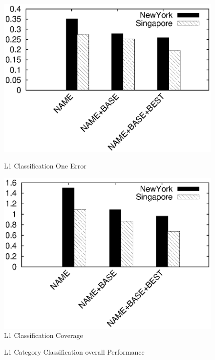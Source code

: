 \begin{figure}
\begin{minipage}[ht]{0.5\linewidth}
\centering
\includegraphics[width=\columnwidth]{plot/Graph_Youer/FirstClassOneError.eps}
\caption{L1 Classification One Error}
\label{fig:L1OneError}
\end{minipage}
\begin{minipage}[ht]{0.5\linewidth}
\centering
\includegraphics[width=\columnwidth]{plot/Graph_Youer/FirstClassCoverage.eps}
\caption{L1 Classification Coverage}
\label{fig:L1Coverage}
\end{minipage}
\end{figure}

\begin{figure}[h]
\centering
\hspace{-3cm}
\hspace{-3cm}
\hspace{-3cm}
\caption{L1 Category Classification overall Performance}
\label{fig:L1Overall}
\end{figure}


